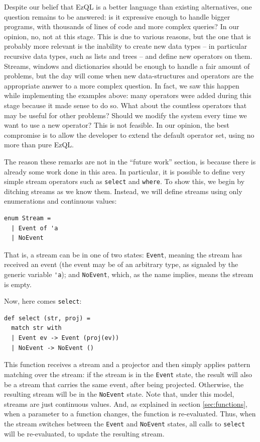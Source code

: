 Despite our belief that EzQL is a better language than existing
alternatives, one question remains to be answered: is it expressive
enough to handle bigger programs, with thousands of lines of code and
more complex queries? In our opinion, no, not at this stage. This is
due to various reasons, but the one that is probably more relevant is
the inability to create new data types -- in particular recursive data
types, such as lists and trees -- and define new operators on
them. Streams, windows and dictionaries should be enough to handle a
fair amount of problems, but the day will come when new
data-structures and operators are the appropriate answer to a more
complex question. In fact, we saw this happen while implementing the
examples above: many operators were added during this stage because it
made sense to do so. What about the countless operators that may be
useful for other problems? Should we modify the system every time we
want to use a new operator? This is not feasible. In our opinion, the
best compromise is to allow the developer to extend the default
operator set, using no more than pure EzQL.

The reason these remarks are not in the ``future work'' section, is
because there is already some work done in this area. In particular,
it is possible to define very simple stream operators such as
\verb=select= and \verb=where=. To show this, we begin by ditching
streams as we know them. Instead, we will define streams using only
enumerations and continuous values:

\begin{lstlisting}
enum Stream =
  | Event of 'a
  | NoEvent
\end{lstlisting}

That is, a stream can be in one of two states: \verb=Event=, meaning
the stream has received an event (the event may be of an arbitrary
type, as signaled by the generic variable \verb='a=); and
\verb=NoEvent=, which, as the name implies, means the stream is empty.

Now, here comes \verb=select=:

\begin{lstlisting}
def select (str, proj) =
  match str with
  | Event ev -> Event (proj(ev))
  | NoEvent -> NoEvent ()
\end{lstlisting}

This function receives a stream and a projector and then simply
applies pattern matching over the stream: if the stream is in the
\verb=Event= state, the result will also be a stream that carries the
same event, after being projected. Otherwise, the resulting stream
will be in the \verb=NoEvent= state. Note that, under this model,
streams are just continuous values. And, as explained in section
\ref{sec:functions}, when a parameter to a function changes, the
function is re-evaluated. Thus, when the stream switches between the
\verb=Event= and \verb=NoEvent= states, all calls to \verb=select=
will be re-evaluated, to update the resulting stream.

